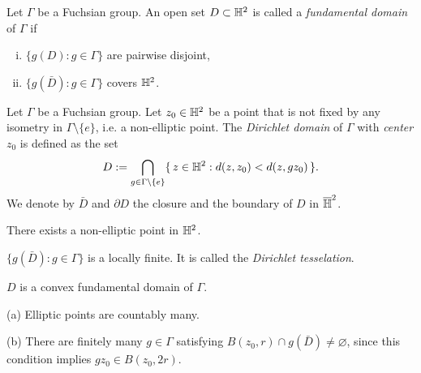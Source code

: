 \documentclass[a4paper]{article}
\begin{document}
\begin{prb}
Let $\Gamma$ be a Fuchsian group.
An open set $D\subset\mathbb{H}^2$ is called a \emph{fundamental domain} of $\Gamma$ if
\begin{enumerate}[(i)]
\item $\{g(D):g\in\Gamma\}$ are pairwise disjoint,
\item $\{g(\bar D):g\in\Gamma\}$ covers $\mathbb{H}^2$.
\end{enumerate}
\end{prb}

\begin{prb}
Let $\Gamma$ be a Fuchsian group.
Let $z_0\in\mathbb{H}^2$ be a point that is not fixed by any isometry in $\Gamma\setminus\{e\}$, i.e. a non-elliptic point.
The \emph{Dirichlet domain} of $\Gamma$ with \emph{center} $z_0$ is defined as the set
\[D:=\bigcap_{g\in\Gamma\setminus\{e\}}\{\,z\in\mathbb{H}^2:d(z,z_0)<d(z,gz_0)\,\}.\]
We denote by $\bar D$ and $\partial D$ the closure and the boundary of $D$ in $\overline{\mathbb{H}}^2$.
\begin{parts}
\item There exists a non-elliptic point in $\mathbb{H}^2$.
\item $\{g(\bar D):g\in\Gamma\}$ is a locally finite. It is called the \emph{Dirichlet tesselation}.
\item $D$ is a convex fundamental domain of $\Gamma$.
\end{parts}
\end{prb}
\begin{pf}
(a)
Elliptic points are countably many.

(b)
There are finitely many $g\in\Gamma$ satisfying $B(z_0,r)\cap g(\bar D)\ne\varnothing$, since this condition implies $gz_0\in B(z_0,2r)$.
\end{pf}
\end{document}
